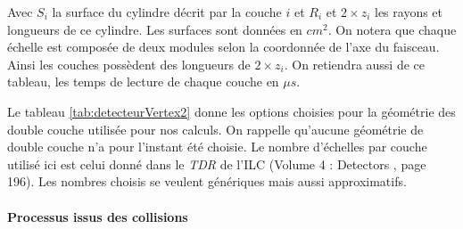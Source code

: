   Avec $S_i$ la surface du cylindre d\'ecrit par la couche $i$ et $R_i$ et $2 \times z_i$ les rayons et longueurs de ce cylindre. Les surfaces sont donn\'ees en $cm^2$. On notera que chaque \'echelle est compos\'ee de deux modules selon la coordonn\'ee de l'axe du faisceau. Ainsi les couches poss\`edent des longueurs de $2 \times z_i$. On retiendra aussi de ce tableau, les temps de lecture de chaque couche en $\mu s$.
  
  \medskip
  
  Le tableau \ref{tab:detecteurVertex2} donne les options choisies pour la g\'eom\'etrie des double couche utilis\'ee pour nos calculs. On rappelle qu'aucune g\'eom\'etrie de double couche n'a pour l'instant \'et\'e choisie. Le nombre d'\'echelles par couche utilis\'e ici est celui donn\'e dans le \textit{TDR} de l'ILC (Volume 4 : Detectors \cite{Behnke:2013lya}, page 196). Les nombres choisis se veulent g\'en\'eriques mais aussi approximatifs.
  
  \paragraph{Processus issus des collisions}
 
 \smallskip
  
 \FloatBarrier
  
